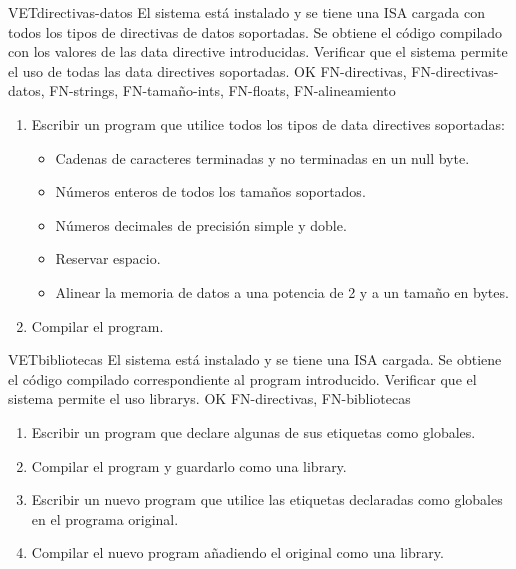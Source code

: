 \begin{testCase}{VET}{directivas-datos}
    {El sistema está instalado y se tiene una \gls{ISA} cargada con todos los
    tipos de directivas de datos soportadas.} %
    {Se obtiene el código compilado con los valores de las \gls{data directive} introducidas.} %
    {Verificar que el sistema permite el uso de todas las \glspl{data directive} soportadas.} %
    {OK} %
    {FN-directivas, FN-directivas-datos, FN-strings, FN-tamaño-ints, FN-floats, FN-alineamiento} %
    \begin{enumerate}[leftmargin=*, topsep=0pt, noitemsep] %
        \item Escribir un \gls{program} que utilice todos los tipos de
        \glspl{data directive} soportadas:
        \begin{itemize}
            \item Cadenas de caracteres terminadas y no terminadas en un
            \gls{null byte}.
            \item Números enteros de todos los tamaños soportados.
            \item Números decimales de precisión simple y doble.
            \item Reservar espacio.
            \item Alinear la memoria de datos a una potencia de 2 y a un tamaño en bytes.
        \end{itemize}
        \item Compilar el \gls{program}.
    \end{enumerate}
\end{testCase}

\begin{testCase}{VET}{bibliotecas}
    {El sistema está instalado y se tiene una \gls{ISA} cargada.} %
    {Se obtiene el código compilado correspondiente al \gls{program} introducido.} %
    {Verificar que el sistema permite el uso \glspl{library}.} %
    {OK} %
    {FN-directivas, FN-bibliotecas} %
    \begin{enumerate}[leftmargin=*, topsep=0pt, noitemsep] %
        \item Escribir un \gls{program} que declare algunas de sus etiquetas
        como globales.
        \item Compilar el \gls{program} y guardarlo como una \gls{library}.
        \item Escribir un nuevo \gls{program} que utilice las etiquetas
        declaradas como globales en el programa original.
        \item Compilar el nuevo \gls{program} añadiendo el original como una
        \gls{library}.
    \end{enumerate}
\end{testCase}

